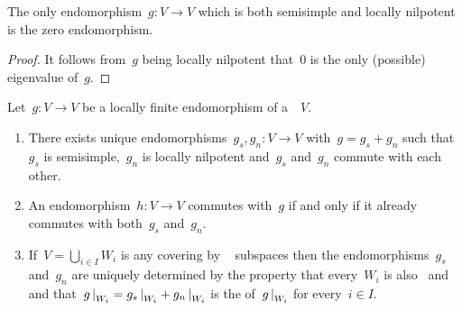 \begin{lemma}
  \label{ss and locally np is zero}
  The only endomorphism~$g \colon V \to V$ which is both semisimple and locally nilpotent is the zero endomorphism.
\end{lemma}


\begin{proof}
  It follows from~$g$ being locally nilpotent that~$0$ is the only (possible) eigenvalue of~$g$.
\end{proof}


\begin{proposition}
  \label{local jcd}
  Let~$g \colon V \to V$ be a locally finite endomorphism of a~{\kvs}~$V$.
  \begin{enumerate}
    \item
      \label{the local jcd itself}
      There exists unique endomorphisms~$g_s, g_n \colon V \to V$ with~$g = g_s + g_n$ such that~$g_s$ is semisimple,~$g_n$ is locally nilpotent and~$g_s$ and~$g_n$ commute with each other.
    \item
      \label{commuting via local jcd}
      An endomorphism~$h \colon V \to V$ commutes with~$g$ if and only if it already commutes with both~$g_s$ and~$g_n$.
    \item
      \label{local jcd via cover}
      If~$V = \bigcup_{i \in I} W_i$ is any covering by {\fd}~ subspaces then the endomorphisms~$g_s$ and~$g_n$ are uniquely determined by the property that every~$W_i$ is also~ and~ and that~$\restrict{g}{W_i} = \restrict{g_s}{W_i} + \restrict{g_n}{W_i}$ is the {\JCD} of~$\restrict{g}{W_i}$ for every~$i \in I$.
  \end{enumerate}
\end{proposition}



